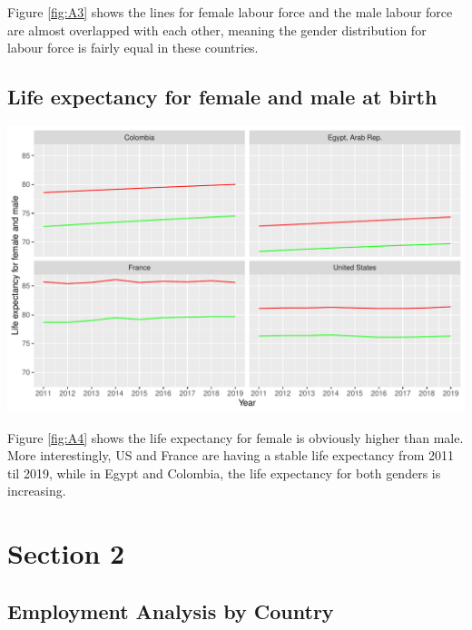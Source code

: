 \documentclass[11pt,a4paper,]{article}
\let\origfigure\figure
\let\endorigfigure\endfigure
\renewenvironment{figure}[1][2] {
    \expandafter\origfigure\expandafter[H]
} {
    \endorigfigure
}
\begin{document}
Figure \ref{fig:A3} shows the lines for female labour force and the male labour force are almost overlapped with each other, meaning the gender distribution for labour force is fairly equal in these countries.

\hypertarget{life-expectancy-for-female-and-male-at-birth}{%
\subsection{Life expectancy for female and male at birth}\label{life-expectancy-for-female-and-male-at-birth}}

\begin{figure}
\centering
\includegraphics{The_Outsiders_5513_files/figure-latex/A4-1.pdf}
\caption{\label{fig:A4}Life expectancy for female and male at birth}
\end{figure}

Figure \ref{fig:A4} shows the life expectancy for female is obviously higher than male. More interestingly, US and France are having a stable life expectancy from 2011 til 2019, while in Egypt and Colombia, the life expectancy for both genders is increasing.

\clearpage

\section*{Section 2}

\hypertarget{employment-analysis-by-country}{%
\subsection{Employment Analysis by Country}\label{employment-analysis-by-country}}
\end{document}
